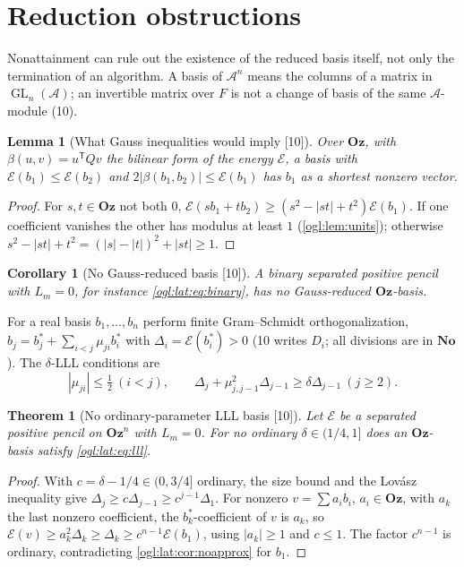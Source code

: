 \documentclass[11pt,oneside]{article}
\numberwithin{equation}{section}
\newtheorem{theorem}{Theorem}[section]
\newtheorem{lemma}[lemma]{Lemma}
\newtheorem{corollary}[corollary]{Corollary}
\theoremstyle{definition}
\theoremstyle{remark}
\newcommand{\No}{\mathbf{No}}
\newcommand{\Oz}{\mathbf{Oz}}
\newcommand{\A}{\mathcal A}
\newcommand{\cE}{\mathcal E}
\newcommand{\GL}{\operatorname{GL}}
\newcommand{\src}[1]{\textup{\textsf{\small[#1]}}}
\begin{document}
\section{Reduction obstructions}\label{ogl:lat:sec:reduction}

Nonattainment can rule out the existence of the reduced basis itself, not only
the termination of an algorithm. A basis of $\A^n$ means the columns of a matrix
in $\GL_n(\A)$; an invertible matrix over $F$ is not a change of basis of the
same $\A$-module (10).

\begin{lemma}[What Gauss inequalities would imply \src{10}]\label{ogl:lat:lem:gauss}
Over $\Oz$, with $\beta(u,v)=u^{\mathsf T}Qv$ the bilinear form of the energy
$\cE$, a basis with $\cE(b_1)\le\cE(b_2)$ and $2|\beta(b_1,b_2)|\le\cE(b_1)$ has
$b_1$ as a shortest nonzero vector.
\end{lemma}
\begin{proof}
For $s,t\in\Oz$ not both $0$,
$\cE(sb_1+tb_2)\ge(s^2-|st|+t^2)\cE(b_1)$. If one coefficient vanishes the other
has modulus at least $1$ (\cref{ogl:lem:units}); otherwise
$s^2-|st|+t^2=(|s|-|t|)^2+|st|\ge1$.
\end{proof}

\begin{corollary}[No Gauss-reduced basis \src{10}]\label{ogl:lat:cor:nogauss}
A binary separated positive pencil with $L_m=0$, for instance
\eqref{ogl:lat:eq:binary}, has no Gauss-reduced $\Oz$-basis.
\end{corollary}

For a real basis $b_1,\dots,b_n$ perform finite Gram--Schmidt orthogonalization,
$b_j=b_j^*+\sum_{i<j}\mu_{ji}b_i^*$ with $\Delta_i=\cE(b_i^*)>0$ (10 writes $D_i$;
all divisions are in $\No$). The $\delta$-LLL conditions \cite{LLL} are
\begin{equation}\label{ogl:lat:eq:lll}
 |\mu_{ji}|\le\tfrac12\ (i<j),\qquad
 \Delta_j+\mu_{j,j-1}^2\Delta_{j-1}\ge\delta\Delta_{j-1}\ (j\ge2).
\end{equation}

\begin{theorem}[No ordinary-parameter LLL basis \src{10}]\label{ogl:lat:thm:nolll}
Let $\cE$ be a separated positive pencil on $\Oz^n$ with $L_m=0$. For no ordinary
$\delta\in(1/4,1]$ does an $\Oz$-basis satisfy \eqref{ogl:lat:eq:lll}.
\end{theorem}
\begin{proof}
With $c=\delta-1/4\in(0,3/4]$ ordinary, the size bound and the Lov\'asz inequality
give $\Delta_j\ge c\Delta_{j-1}\ge c^{j-1}\Delta_1$. For nonzero
$v=\sum a_ib_i$, $a_i\in\Oz$, with $a_k$ the last nonzero coefficient, the
$b_k^*$-coefficient of $v$ is $a_k$, so
$\cE(v)\ge a_k^2\Delta_k\ge\Delta_k\ge c^{n-1}\cE(b_1)$, using $|a_k|\ge1$ and
$c\le1$. The factor $c^{n-1}$ is ordinary, contradicting
\cref{ogl:lat:cor:noapprox} for $b_1$.
\end{proof}
\end{document}
